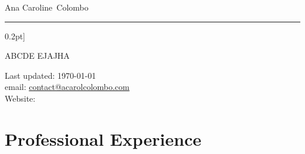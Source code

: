 \documentclass[11pt, a4paper]{article}
\makeatletter
\newcommand{\FirstName}{Ana Caroline}
\newcommand{\LastName}{Colombo}
\newcommand{\MyName}{\FirstName\ \LastName}
\newcommand{\Email}{contact@acarolcolombo.com}
\makeatother
\begin{document}
\thispagestyle{empty}


{\fontsize{20pt}{0}\selectfont \MyName}	\\[0.3cm]
\rule{\textwidth}[0.2pt]
\begin{minipage}[t]{0.595\textwidth}
	ABCDE EJAJHA
\end{minipage}
\begin{minipage}[t]{0.405\textwidth}
  \begin{flushright}
  Last updated: \monthyear\today
  \\
    email: \href{mailto:\Email}{\Email}
    \\
    Website: \href{https://www.\PersonalWebsite}{\PersonalWebsite}
  \end{flushright}
\end{minipage}

\section*{Professional Experience}
\end{document}
